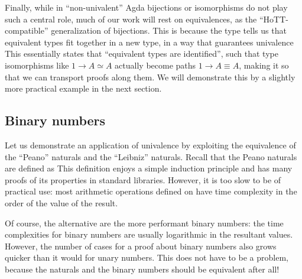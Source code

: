 Finally, while in ``non-univalent'' Agda bijections or isomorphisms do not play such a central role, much of our work will rest on equivalences, as the ``HoTT-compatible'' generalization of bijections. This is because the  type tells us that equivalent types fit together in a new type, in a way that guarantees univalence
This essentially states that ``equivalent types are identified'', such that type isomorphisms like $1 \to A \simeq A$ actually become paths $1 \to A \equiv A$, making it so that we can transport proofs along them. We will demonstrate this by a slightly more practical example in the next section.


\subsection{Binary numbers}\label{ssec:binary}
Let us demonstrate an application of univalence by exploiting the equivalence of the ``Peano'' naturals and the ``Leibniz'' naturals. Recall that the Peano naturals are defined as 
This definition enjoys a simple induction principle and has many proofs of its properties in standard libraries. However, it is too slow to be of practical use: most arithmetic operations defined on \bN{} have time complexity in the order of the value of the result.

Of course, the alternative are the more performant binary numbers: the time complexities for binary numbers are usually logarithmic in the resultant values. However, the number of cases for a proof about binary numbers also grows quicker than it would for unary numbers. This does not have to be a problem, because the \bN{} naturals and the binary numbers should be equivalent after all!

